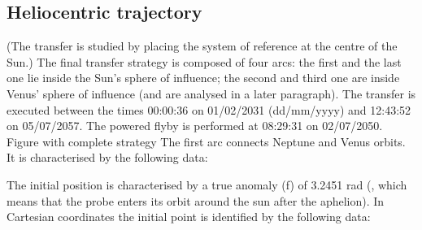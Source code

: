 \documentclass[11pt,a4paper]{report}
\begin{document}
\subsection{Heliocentric trajectory}
(The transfer is studied by placing the system of reference at the centre of the Sun.)
The final transfer strategy is composed of four arcs: the first and the last one lie inside the Sun’s sphere of influence; the second and third one are inside Venus’ sphere of influence (and are analysed in a later paragraph). The transfer is executed between the times 00:00:36 on 01/02/2031 (dd/mm/yyyy) and 12:43:52 on 05/07/2057. The powered flyby is performed at 08:29:31 on 02/07/2050.
Figure with complete strategy
The first arc connects Neptune and Venus orbits. It is characterised by the following data:

\begin{table}[H]
\centering
{}
\end{table}

The initial position is characterised by a true anomaly (f) of 3.2451 rad (, which means that the probe enters its orbit around the sun after the aphelion). In Cartesian coordinates the initial point is identified by the following data:

\begin{table}[H]
\centering
{}
\end{table}
\end{document}
